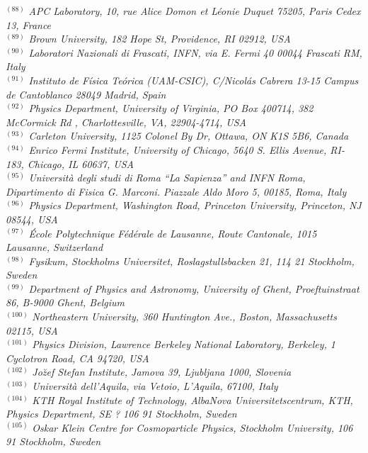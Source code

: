 {\begin{center}
$^{(88)}$ \emph{APC Laboratory, 10, rue Alice Domon et L\'eonie Duquet 75205, Paris Cedex 13, France}\\
$^{(89)}$ \emph{Brown University, 182 Hope St, Providence, RI 02912, USA}\\
$^{(90)}$ \emph{Laboratori Nazionali di Frascati, INFN, via E. Fermi 40 00044 Frascati RM, Italy}\\
$^{(91)}$ \emph{Instituto de F\'isica Te\'orica (UAM-CSIC), C/Nicol\'as Cabrera 13-15 Campus de Cantoblanco 28049 Madrid, Spain}\\
$^{(92)}$ \emph{Physics Department, University of Virginia,  PO Box 400714, 382 McCormick Rd ,  Charlottesville, VA, 22904-4714, USA}\\
$^{(93)}$ \emph{Carleton University, 1125 Colonel By Dr, Ottawa, ON K1S 5B6, Canada}\\
$^{(94)}$ \emph{Enrico Fermi Institute, University of Chicago, 5640 S. Ellis Avenue, RI-183, Chicago, IL 60637, USA}\\
$^{(95)}$ \emph{Universit\`a degli studi di Roma ``La Sapienza'' and INFN Roma, Dipartimento di Fisica G. Marconi. Piazzale Aldo Moro 5, 00185, Roma, Italy}\\
$^{(96)}$ \emph{Physics Department, Washington Road, Princeton University, Princeton, NJ 08544, USA}\\
$^{(97)}$ \emph{\'Ecole Polytechnique F\'ed\'erale de Lausanne, Route Cantonale, 1015 Lausanne, Switzerland}\\
$^{(98)}$ \emph{Fysikum, Stockholms Universitet, Roslagstullsbacken 21, 114 21 Stockholm, Sweden}\\
$^{(99)}$ \emph{Department of Physics and Astronomy, University of Ghent, Proeftuinstraat 86, B-9000 Ghent, Belgium}\\
$^{(100)}$ \emph{Northeastern University, 360 Huntington Ave., Boston, Massachusetts 02115, USA}\\
$^{(101)}$ \emph{Physics Division, Lawrence Berkeley National Laboratory, Berkeley, 1 Cyclotron Road, CA 94720, USA}\\
$^{(102)}$ \emph{Jo\u zef Stefan Institute, Jamova 39, Ljubljana 1000, Slovenia}\\
$^{(103)}$ \emph{Universit\`a dell'Aquila, via Vetoio, L'Aquila, 67100, Italy}\\
$^{(104)}$ \emph{KTH Royal Institute of Technology, AlbaNova Universitetscentrum, KTH, Physics Department, SE ? 106 91 Stockholm, Sweden}\\
$^{(105)}$ \emph{Oskar Klein Centre for Cosmoparticle Physics, Stockholm University, 106 91 Stockholm, Sweden}\\

\end{center}}
